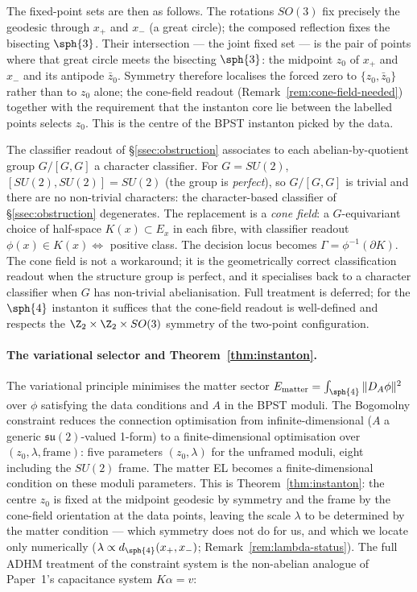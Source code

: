 The fixed-point sets are then as follows. The rotations $SO(3)$ fix
precisely the geodesic through $x_+$ and $x_-$ (a great circle); the
composed reflection fixes the bisecting $\sph{3}$. Their
intersection --- the joint fixed set --- is the pair of points where
that great circle meets the bisecting $\sph{3}$: the midpoint $z_0$
of $x_+$ and $x_-$ and its antipode $\bar z_0$. Symmetry therefore
localises the forced zero to $\{z_0,\bar z_0\}$ rather than to $z_0$
alone; the cone-field readout
(Remark~\ref{rem:cone-field-needed}) together with the requirement
that the instanton core lie between the labelled points selects
$z_0$. This is the centre of the BPST instanton picked by the data.

\begin{remark}\label{rem:cone-field-needed}
The classifier readout of \S\ref{ssec:obstruction} associates to
each abelian-by-quotient group $G/[G,G]$ a character classifier. For
$G=SU(2)$, $[SU(2),SU(2)]=SU(2)$ (the group is \emph{perfect}), so
$G/[G,G]$ is trivial and there are no non-trivial characters: the
character-based classifier of \S\ref{ssec:obstruction} degenerates.
The replacement is a \emph{cone field}: a $G$-equivariant choice of
half-space $K(x)\subset E_x$ in each fibre, with classifier readout
$\phi(x)\in K(x)\Leftrightarrow$ positive class. The decision
locus becomes $\Gamma=\phi^{-1}(\partial K)$. The cone field is not a
workaround; it is the geometrically correct classification readout
when the structure group is perfect, and it specialises back to a
character classifier when $G$ has non-trivial abelianisation. Full
treatment is deferred; for the $\sph{4}$ instanton it suffices that
the cone-field readout is well-defined and respects the
$\Z_2\times\Z_2\times SO(3)$ symmetry of the two-point
configuration.
\end{remark}

\paragraph{The variational selector and Theorem~\ref{thm:instanton}.}
The variational principle minimises the matter sector
$E_{\mathrm{matter}}=\int_{\sph{4}}\|D_A\phi\|^2$ over $\phi$
satisfying the data conditions and $A$ in the BPST moduli. The
Bogomolny constraint reduces the connection optimisation from
infinite-dimensional ($A$ a generic $\mathfrak{su}(2)$-valued
1-form) to a finite-dimensional optimisation over
$(z_0,\lambda,\text{frame})$: five parameters $(z_0,\lambda)$ for the
unframed moduli, eight including the $SU(2)$ frame.
The matter EL becomes a finite-dimensional condition on these moduli
parameters. This is Theorem~\ref{thm:instanton}: the centre $z_0$ is
fixed at the midpoint geodesic by symmetry and the frame by the
cone-field orientation at the data points, leaving the scale
$\lambda$ to be determined by the matter condition --- which
symmetry does not do for us, and which we locate only numerically
($\lambda\propto d_{\sph{4}}(x_+,x_-)$;
Remark~\ref{rem:lambda-status}). The full ADHM treatment of the constraint system is
the non-abelian analogue of Paper~1's capacitance system
$K\alpha=v$:


